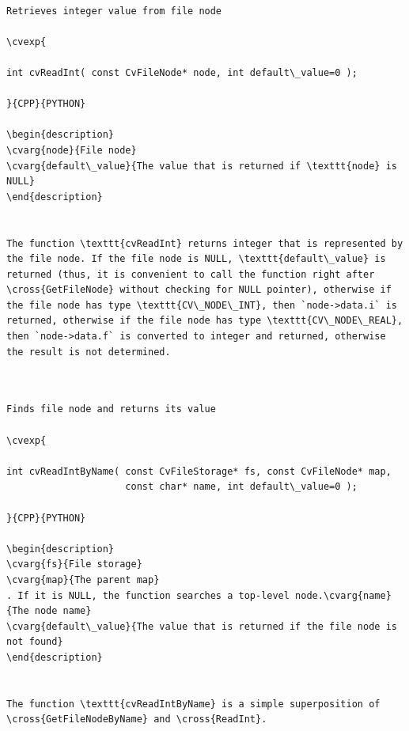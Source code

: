 \begin{verbatim}

Retrieves integer value from file node

\cvexp{

int cvReadInt( const CvFileNode* node, int default\_value=0 );

}{CPP}{PYTHON}

\begin{description}
\cvarg{node}{File node}
\cvarg{default\_value}{The value that is returned if \texttt{node} is NULL}
\end{description}


The function \texttt{cvReadInt} returns integer that is represented by the file node. If the file node is NULL, \texttt{default\_value} is returned (thus, it is convenient to call the function right after \cross{GetFileNode} without checking for NULL pointer), otherwise if the file node has type \texttt{CV\_NODE\_INT}, then `node->data.i` is returned, otherwise if the file node has type \texttt{CV\_NODE\_REAL}, then `node->data.f` is converted to integer and returned, otherwise the result is not determined.


\end{verbatim}
\label{ReadIntByName}
\begin{verbatim}

Finds file node and returns its value

\cvexp{

int cvReadIntByName( const CvFileStorage* fs, const CvFileNode* map,
                     const char* name, int default\_value=0 );

}{CPP}{PYTHON}

\begin{description}
\cvarg{fs}{File storage}
\cvarg{map}{The parent map}
. If it is NULL, the function searches a top-level node.\cvarg{name}{The node name}
\cvarg{default\_value}{The value that is returned if the file node is not found}
\end{description}


The function \texttt{cvReadIntByName} is a simple superposition of \cross{GetFileNodeByName} and \cross{ReadInt}.


\end{verbatim}
\label{ReadReal}
